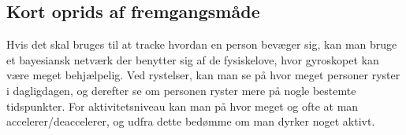 \subsection{Kort oprids af fremgangsmåde} 
Hvis det skal bruges til at tracke hvordan en person bevæger sig, kan man bruge et bayesiansk netværk der benytter sig af de fysiskelove, hvor gyroskopet kan være meget behjælpelig. Ved rystelser, kan man se på hvor meget personer ryster i dagligdagen, og derefter se om personen ryster mere på nogle bestemte tidspunkter. For aktivitetsniveau kan man på hvor meget og ofte at man accelerer/deaccelerer, og udfra dette bedømme om man dyrker noget aktivt.